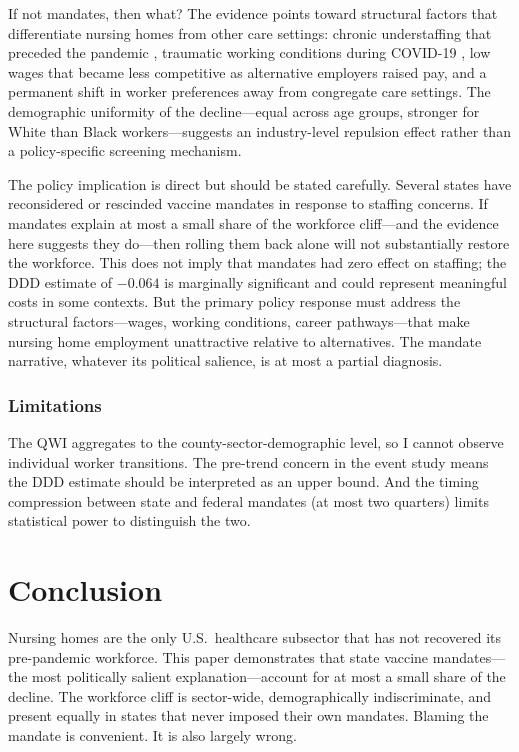 \documentclass[12pt]{article}
\begin{document}
If not mandates, then what? The evidence points toward structural factors that differentiate nursing homes from other care settings: chronic understaffing that preceded the pandemic \citep{mcgarry2021association}, traumatic working conditions during COVID-19 \citep{white2021front}, low wages that became less competitive as alternative employers raised pay, and a permanent shift in worker preferences away from congregate care settings. The demographic uniformity of the decline---equal across age groups, stronger for White than Black workers---suggests an industry-level repulsion effect rather than a policy-specific screening mechanism.

The policy implication is direct but should be stated carefully. Several states have reconsidered or rescinded vaccine mandates in response to staffing concerns. If mandates explain at most a small share of the workforce cliff---and the evidence here suggests they do---then rolling them back alone will not substantially restore the workforce. This does not imply that mandates had zero effect on staffing; the DDD estimate of $-0.064$ is marginally significant and could represent meaningful costs in some contexts. But the primary policy response must address the structural factors---wages, working conditions, career pathways---that make nursing home employment unattractive relative to alternatives. The mandate narrative, whatever its political salience, is at most a partial diagnosis.

\subsubsection*{Limitations} The QWI aggregates to the county-sector-demographic level, so I cannot observe individual worker transitions. The pre-trend concern in the event study means the DDD estimate should be interpreted as an upper bound. And the timing compression between state and federal mandates (at most two quarters) limits statistical power to distinguish the two.

\section{Conclusion}

Nursing homes are the only U.S.\ healthcare subsector that has not recovered its pre-pandemic workforce. This paper demonstrates that state vaccine mandates---the most politically salient explanation---account for at most a small share of the decline. The workforce cliff is sector-wide, demographically indiscriminate, and present equally in states that never imposed their own mandates. Blaming the mandate is convenient. It is also largely wrong.
\end{document}
